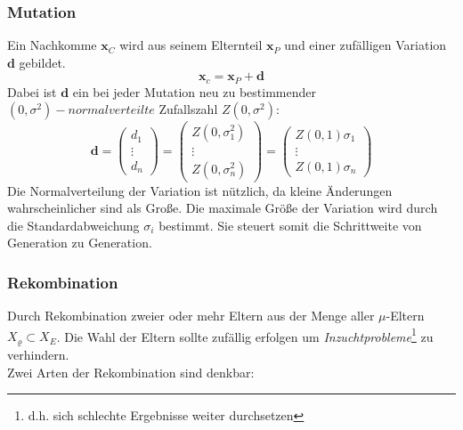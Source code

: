 \subsubsection[Mutation]{Mutation}
Ein Nachkomme $\mathbf{x}_C$ wird aus seinem Elternteil $\mathbf{x}_P$ und einer zufälligen Variation $\mathbf{d}$ gebildet.
\begin{equation} \label{eq:Mutation_Child}
	\mathbf{x}_c = \mathbf{x}_P + \mathbf{d}
\end{equation}
Dabei ist $\mathbf{d}$ ein bei jeder Mutation neu zu bestimmender $(0,\sigma^2)-normalverteilte$ Zufallszahl $Z(0,\sigma^2)$:
\begin{equation}\label{eq:wavenumber_trilateration_model2}
\mathbf{d}=
\left(
	\begin{array}{c}
		d_1 \\
		\vdots\\
		d_n 
	\end{array}
\right)
=
\left(
	\begin{array}{c}
		Z(0,\sigma_1^2) \\
		\vdots\\
		Z(0,\sigma_n^2) 
	\end{array}
\right)
=
\left(
	\begin{array}{c}
		Z(0,1) \sigma_1 \\
		\vdots\\
		Z(0,1) \sigma_n 
	\end{array}
\right)
\end{equation}
%
Die Normalverteilung der Variation ist nützlich, da kleine Änderungen wahrscheinlicher sind als Große. Die maximale Größe der Variation wird durch die Standardabweichung $\sigma_i$ bestimmt. Sie steuert somit die Schrittweite von Generation zu Generation.
%
\subsubsection[Rekombination]{Rekombination}
Durch Rekombination zweier oder mehr Eltern aus der Menge aller $\mu$-Eltern $X_{\varrho} \subset X_E$. Die Wahl der Eltern sollte zufällig erfolgen um \textit{Inzuchtprobleme}\footnote{d.h. sich schlechte Ergebnisse weiter durchsetzen} zu verhindern.\\
Zwei Arten der Rekombination sind denkbar:\\

